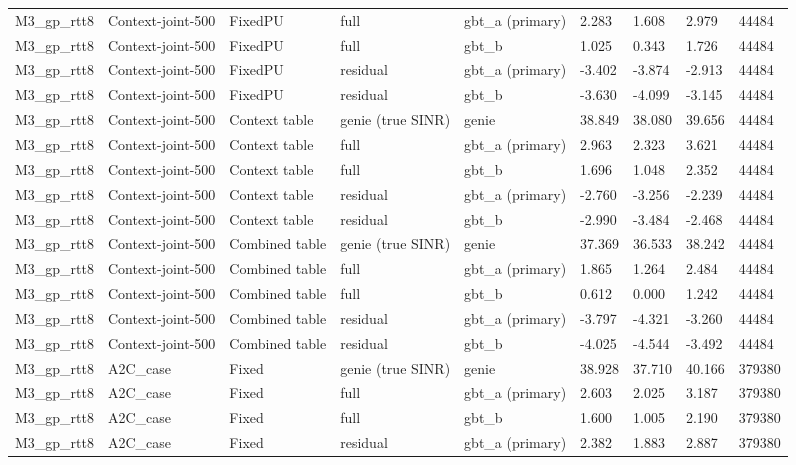 \documentclass[10pt]{article}
\begin{document}
\begin{landscape}
\begin{longtable}{@{}lllllllll@{}}
M3\_gp\_rtt8 & Context-joint-500 & FixedPU & full & gbt\_a (primary) & 2.283 & 1.608 & 2.979 & 44484 \\
M3\_gp\_rtt8 & Context-joint-500 & FixedPU & full & gbt\_b & 1.025 & 0.343 & 1.726 & 44484 \\
M3\_gp\_rtt8 & Context-joint-500 & FixedPU & residual & gbt\_a (primary) & -3.402 & -3.874 & -2.913 & 44484 \\
M3\_gp\_rtt8 & Context-joint-500 & FixedPU & residual & gbt\_b & -3.630 & -4.099 & -3.145 & 44484 \\
M3\_gp\_rtt8 & Context-joint-500 & Context table & genie (true SINR) & genie & 38.849 & 38.080 & 39.656 & 44484 \\
M3\_gp\_rtt8 & Context-joint-500 & Context table & full & gbt\_a (primary) & 2.963 & 2.323 & 3.621 & 44484 \\
M3\_gp\_rtt8 & Context-joint-500 & Context table & full & gbt\_b & 1.696 & 1.048 & 2.352 & 44484 \\
M3\_gp\_rtt8 & Context-joint-500 & Context table & residual & gbt\_a (primary) & -2.760 & -3.256 & -2.239 & 44484 \\
M3\_gp\_rtt8 & Context-joint-500 & Context table & residual & gbt\_b & -2.990 & -3.484 & -2.468 & 44484 \\
M3\_gp\_rtt8 & Context-joint-500 & Combined table & genie (true SINR) & genie & 37.369 & 36.533 & 38.242 & 44484 \\
M3\_gp\_rtt8 & Context-joint-500 & Combined table & full & gbt\_a (primary) & 1.865 & 1.264 & 2.484 & 44484 \\
M3\_gp\_rtt8 & Context-joint-500 & Combined table & full & gbt\_b & 0.612 & 0.000 & 1.242 & 44484 \\
M3\_gp\_rtt8 & Context-joint-500 & Combined table & residual & gbt\_a (primary) & -3.797 & -4.321 & -3.260 & 44484 \\
M3\_gp\_rtt8 & Context-joint-500 & Combined table & residual & gbt\_b & -4.025 & -4.544 & -3.492 & 44484 \\
M3\_gp\_rtt8 & A2C\_case & Fixed & genie (true SINR) & genie & 38.928 & 37.710 & 40.166 & 379380 \\
M3\_gp\_rtt8 & A2C\_case & Fixed & full & gbt\_a (primary) & 2.603 & 2.025 & 3.187 & 379380 \\
M3\_gp\_rtt8 & A2C\_case & Fixed & full & gbt\_b & 1.600 & 1.005 & 2.190 & 379380 \\
M3\_gp\_rtt8 & A2C\_case & Fixed & residual & gbt\_a (primary) & 2.382 & 1.883 & 2.887 & 379380 \\

\end{longtable}
\end{landscape}
\end{document}
